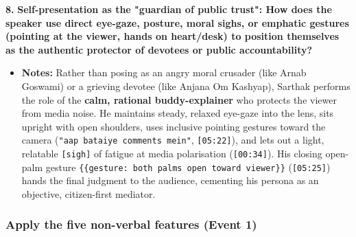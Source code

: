 \documentclass[10pt,a4paper]{article}
\begin{document}
\noindent\textbf{8.} \textbf{Self-presentation as the "guardian of public trust": How does the speaker use direct eye-gaze, posture, moral sighs, or emphatic gestures (pointing at the viewer, hands on heart/desk) to position themselves as the authentic protector of devotees or public accountability?}\par\smallskip
\begin{itemize}
  \item \textbf{Notes:}
Rather than posing as an angry moral crusader (like Arnab Goswami) or a grieving devotee (like Anjana Om Kashyap), Sarthak performs the role of the \textbf{calm, rational buddy-explainer} who protects the viewer from media noise. He maintains steady, relaxed eye-gaze into the lens, sits upright with open shoulders, uses inclusive pointing gestures toward the camera (\texttt{"aap bataiye comments mein"}, \texttt{[05:22]}), and lets out a light, relatable \texttt{[sigh]} of fatigue at media polarisation (\texttt{[00:34]}). His closing open-palm gesture \texttt{\{\{gesture: both palms open toward viewer\}\}} (\texttt{[05:25]}) hands the final judgment to the audience, cementing his persona as an objective, citizen-first mediator.\par\smallskip
\end{itemize}

\subsubsection*{Apply the five non-verbal features (Event 1)}
\end{document}

